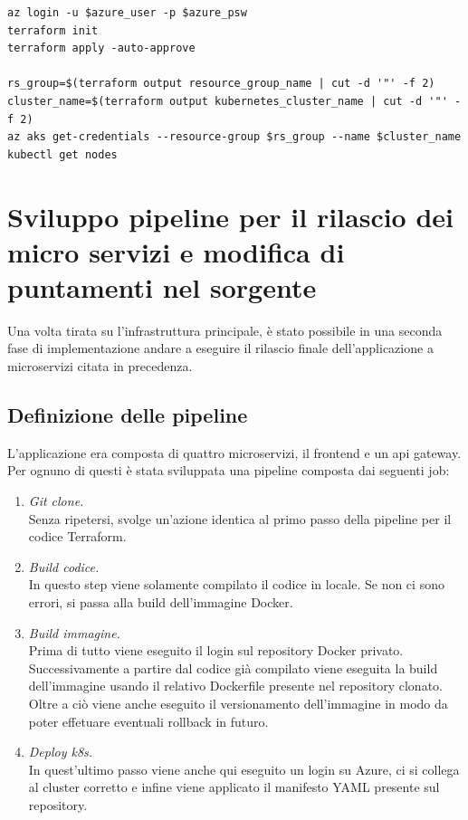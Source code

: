 \documentclass[a4paper,12pt]{report}
\begin{document}
\begin{lstlisting}[caption={\\\textit{Frammento di codice relativo alla compilazione del codice Terraform.\\ Nelle ultime righe viene effettuato un collegamento con il cluster appena creato e lanciato un comando per visualizzare i nodi in modo da accertarsi che sia operativo.}}]
az login -u $azure_user -p $azure_psw
terraform init
terraform apply -auto-approve 

rs_group=$(terraform output resource_group_name | cut -d '"' -f 2)
cluster_name=$(terraform output kubernetes_cluster_name | cut -d '"' -f 2)
az aks get-credentials --resource-group $rs_group --name $cluster_name
kubectl get nodes
\end{lstlisting}

\section{Sviluppo pipeline per il rilascio dei micro servizi e modifica di puntamenti nel sorgente}
Una volta tirata su l'infrastruttura principale, è stato possibile in una seconda fase di implementazione andare a eseguire il rilascio finale dell'applicazione a microservizi citata in precedenza.
\subsection{Definizione delle pipeline}
L'applicazione era composta di quattro microservizi, il frontend e un api gateway.\\
Per ognuno di questi è stata sviluppata una pipeline composta dai seguenti job:\\
\begin{enumerate}
\item \textit{Git clone.}\\
Senza ripetersi, svolge un'azione identica al primo passo della pipeline per il codice Terraform.
\item \textit{Build codice.}\\
In questo step viene solamente compilato il codice in locale. Se non ci sono errori, si passa alla build dell'immagine Docker.
\item \textit{Build immagine.}\\
Prima di tutto viene eseguito il login sul repository Docker privato. Successivamente a partire dal codice già compilato viene eseguita la build dell'immagine usando il relativo Dockerfile presente nel repository clonato. Oltre a ciò viene anche eseguito il versionamento dell'immagine in modo da poter effetuare eventuali rollback in futuro.
\item \textit{Deploy k8s.}\\
In quest'ultimo passo viene anche qui eseguito un login su Azure, ci si collega al cluster corretto e infine viene applicato il manifesto YAML presente sul repository. \\ \\ \\
\end{enumerate}
\end{document}
